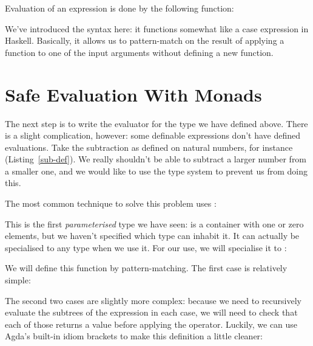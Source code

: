 Evaluation of an expression is done by the following function:
\begin{agdalisting}
\end{agdalisting}
We've introduced the  syntax here: it functions somewhat like
a case expression in Haskell.
Basically, it allows us to pattern-match on the result of applying a function to
one of the input arguments without defining a new function.
\section{Safe Evaluation With Monads}
The next step is to write the evaluator for the type we have defined above.
There is a slight complication, however: some definable expressions don't have
defined evaluations.
Take the subtraction as defined on natural numbers, for instance
(Listing~\ref{sub-def}).
We really shouldn't be able to subtract a larger number from a smaller one, and
we would like to use the type system to prevent us from doing this.

The most common technique to solve this problem uses :
\begin{agdalisting}
\end{agdalisting}
This is the first \emph{parameterised} type we have seen: 
is a container with one or zero elements, but we haven't specified which type
can inhabit it.
It can actually be specialised to any type when we use it.
For our use, we will specialise it to :
\begin{agdalisting}
\end{agdalisting}

We will define this function by pattern-matching.
The first case is relatively simple:
\begin{agdalisting}
\end{agdalisting}

The second two cases are slightly more complex: because we need to recursively
evaluate the subtrees of the expression in each case, we will need to check that
each of those returns a  value before applying
the operator.
Luckily, we can use Agda's built-in idiom brackets to make this definition
a little cleaner: 
\begin{agdalisting}
\end{agdalisting}

